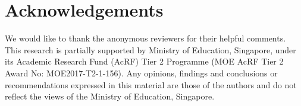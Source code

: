 \documentclass[11pt,a4paper]{article}
\begin{document}
\section*{Acknowledgements}
We would like to thank the anonymous reviewers for their helpful comments.
This research is partially supported by Ministry of Education, Singapore, under its Academic Research Fund (AcRF) Tier 2 Programme (MOE AcRF Tier 2 Award No: MOE2017-T2-1-156). 
Any opinions, findings and conclusions or recommendations expressed in this material are those of the authors and do not reflect the views of the Ministry of Education, Singapore.



\end{document}
